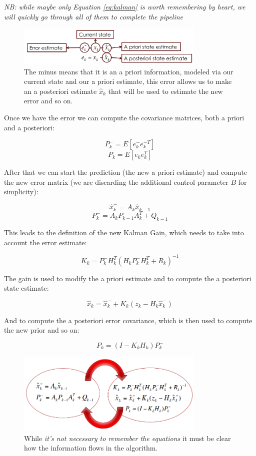 \textit{NB: while maybe only Equation \ref{eq:kalman} is worth remembering by heart, we will quickly go through all of them to complete the pipeline}
\begin{figure}[H]
    \centering
    \includegraphics[width=0.8\textwidth]{Figures/prior.png}
    \caption{The minus means that it is an a priori information, modeled via our current state and our a priori estimate, this error allows us to make an a posteriori estimate $\hat{x}_k$ that will be used to estimate the new error and so on.}
    \label{img:prior}
\end{figure}

Once we have the error we can compute the covariance matrices, both a priori and a posteriori:

\[
    P^-_k = E[e^-_ke^{-T}_k]
\]
\[
    P_k = E[e_ke^T_k]
\]

After that we can start the prediction (the new a priori estimate) and compute the new error matrix (we are discarding the additional control parameter $B$ for simplicity):

\[
    \hat{x}^-_k = A_k\hat{x}_{k-1}
\]
\[
    P^-_k = A_kP_{k-1}A^T_k+Q_{k-1}
\]

This leads to the definition of the new Kalman Gain, which needs to take into account the error estimate:

\[
    K_k = P^-_kH^T_k(H_kP^-_kH^T_k+R_k)^{-1}    
\]

The gain is used to modify the a priori estimate and to compute the a posteriori state estimate:

\[
    \hat{x}_k = \hat{x}^-_k+K_k(z_k-H_k\hat{x}^-_k)
\]

And to compute the a posteriori error covariance, which is then used to compute the new prior and so on:

\[
    P_k = (I-K_kH_k)P^-_k    
\]

\begin{figure}[H]
    \centering
    \includegraphics[width=0.8\textwidth]{Figures/loop.png}
    \caption{While \textit{it's not necessary to remember the equations} it must be clear how the information flows in the algorithm.}
    \label{img:loop}
\end{figure}

